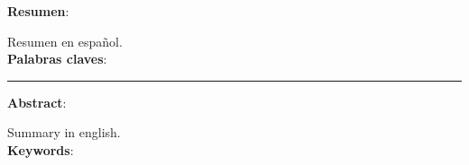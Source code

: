 \textbf{Resumen}:

Resumen en español.
\\

\textbf{Palabras claves}:


\vspace{1cm}

\begin{center}
    \rule{0.5\textwidth}{.4pt}
\end{center}

\vspace{1cm}


\textbf{Abstract}:

Summary in english.
\\

\textbf{Keywords}:
